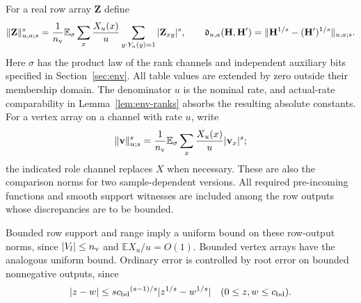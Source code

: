 \documentclass[11pt]{article}
\numberwithin{equation}{section}
\theoremstyle{definition}
\theoremstyle{remark}
\begin{document}
For a real row array ${\mathbf{Z}}$ define
\begin{equation}
 \|{\mathbf{Z}}\|_{u,a;s}^s=
 \frac1{n_{\rm v}}\mathbb E_\sigma\sum_x\frac{X_u(x)}u
                 \sum_{y:Y_a(y)=1}|{\mathbf{Z}}_{xy}|^s,
 \qquad
 \mathfrak d_{u,a}({\mathbf{H}},{\mathbf{H}}')=
   \|{\mathbf{H}}^{1/s}-({\mathbf{H}}')^{1/s}\|_{u,a;s}.
 \label{eq:atom-row-norm}
\end{equation}
Here $\sigma$ has the product law of the rank channels and independent
auxiliary bits specified in Section~\ref{sec:env}.  All table values are
extended by zero outside their membership domain.  The denominator $u$
is the nominal rate, and actual-rate comparability in
Lemma~\ref{lem:env-ranks} absorbs the resulting absolute constants.
For a vertex array on a channel with rate $u$, write
\begin{equation}
 \|{\mathbf{v}}\|_{u;s}^s=
    \frac1{n_{\rm v}}\mathbb E_\sigma\sum_x\frac{X_u(x)}u|{\mathbf{v}}_x|^s;
 \label{eq:atom-vertex-norm}
\end{equation}
the indicated role channel replaces $X$ when necessary.  These are also
the comparison norms for two sample-dependent versions.  All required
pre-incoming functions and smooth support witnesses are included among
the row outputs whose discrepancies are to be bounded.

Bounded row support and range imply a uniform bound on these row-output
norms, since $|V_l|\le {n_{\rm v}}$ and $\mathbb E X_u/u=O(1)$.  Bounded vertex
arrays have the analogous uniform bound.  Ordinary error is controlled
by root error on bounded nonnegative outputs, since
\begin{equation}
 |z-w|\le s {c_{\rm bd}}^{(s-1)/s}|z^{1/s}-w^{1/s}|
 \quad(0\le z,w\le {c_{\rm bd}}).
 \label{eq:atom-ordinary-from-root}
\end{equation}
\end{document}
